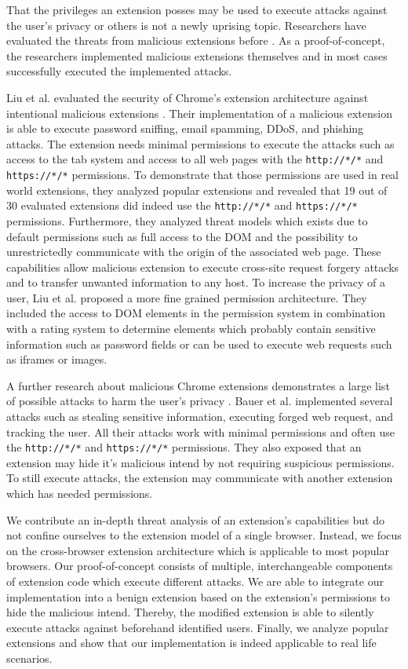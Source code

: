 	That the privileges an extension posses may be used to execute attacks against the user's privacy or others is not a newly uprising topic. Researchers have evaluated the threats from malicious extensions before \cite{Liu12chromeextensions:, extensions:cns14}. As a proof-of-concept, the researchers implemented malicious extensions themselves and in most cases successfully executed the implemented attacks. 
	
	Liu et al. evaluated the security of Chrome's extension architecture against intentional malicious extensions \cite{Liu12chromeextensions:}. Their implementation of a malicious extension is able to execute password sniffing, email spamming, DDoS, and phishing attacks. The extension needs minimal permissions to execute the attacks such as access to the tab system and access to all web pages with the \texttt{http://*/*} and \texttt{https://*/*} permissions. To demonstrate that those permissions are used in real world extensions, they analyzed popular extensions and revealed that 19 out of 30 evaluated extensions did indeed use the \texttt{http://*/*} and \texttt{https://*/*} permissions. Furthermore, they analyzed threat models which exists due to default permissions such as full access to the DOM and the possibility to unrestrictedly communicate with the origin of the associated web page. These capabilities allow malicious extension to execute cross-site request forgery attacks and to transfer unwanted information to any host. To increase the privacy of a user, Liu et al. proposed a more fine grained permission architecture. They included the access to DOM elements in the permission system in combination with a rating system to determine elements which probably contain sensitive information such as password fields or can be used to execute web requests such as iframes or images. 
	
	A further research about malicious Chrome extensions demonstrates a large list of possible attacks to harm the user's privacy \cite{extensions:cns14}. Bauer et al. implemented several attacks such as stealing sensitive information, executing forged web request, and tracking the user. All their attacks work with minimal permissions and often use the \texttt{http://*/*} and \texttt{https://*/*} permissions. They also exposed that an extension may hide it's malicious intend by not requiring suspicious permissions. To still execute attacks, the extension may communicate with another extension which has needed permissions. 
	
	We contribute an in-depth threat analysis of an extension's capabilities but do not confine ourselves to the extension model of a single browser. Instead, we focus on the cross-browser extension architecture which is applicable to most popular browsers. Our proof-of-concept consists of multiple, interchangeable components of extension code which execute different attacks. We are able to integrate our implementation into a benign extension based on the extension's permissions to hide the malicious intend. Thereby, the modified extension is able to silently execute attacks against beforehand identified users. Finally, we analyze popular extensions and show that our implementation is indeed applicable to real life scenarios.
	
